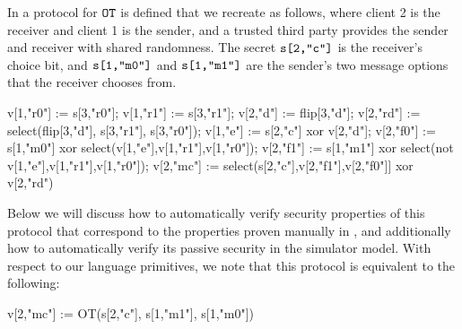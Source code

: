 \begin{example}
  \label{example-OT}
  In \cite{barthe2019probabilistic} a protocol for $\texttt{OT}$ is
  defined that we recreate as follows, where client 2 is the receiver
  and client 1 is the sender, and a trusted third party provides the
  sender and receiver with shared randomness. The secret $\texttt{s[2,"c"]}$
  is the receiver's choice bit, and $\texttt{s[1,"m0"]}$ and $\texttt{s[1,"m1"]}$
  are the sender's two message options that the receiver chooses from. 
  {\small
    \begin{verbatimtab}
      v[1,"r0"] := s[3,"r0"];
      v[1,"r1"] := s[3,"r1"];
      v[2,"d"] := flip[3,"d"];
      v[2,"rd"] := select(flip[3,"d"], s[3,"r1"], s[3,"r0"]);
      v[1,"e"] := s[2,"c"] xor v[2,"d"];
      v[2,"f0"] := s[1,"m0"] xor select(v[1,"e"],v[1,"r1"],v[1,"r0"]);
      v[2,"f1"] := s[1,"m1"] xor select(not v[1,"e"],v[1,"r1"],v[1,"r0"]);
      v[2,"mc"] := select(s[2,"c"],v[2,"f1"],v[2,"f0"]] xor v[2,"rd") \end{verbatimtab}
  }
Below we will discuss how to automatically verify security properties
of this protocol that correspond to the properties proven manually in
\cite{barthe2019probabilistic}, and additionally how to automatically
verify its passive security in the simulator model. With respect to
our language primitives, we note that this protocol is equivalent to
the following:
{\small
\begin{verbatimtab}  
      v[2,"mc"] := OT(s[2,"c"], s[1,"m1"], s[1,"m0"]) \end{verbatimtab}
}
\end{example}



